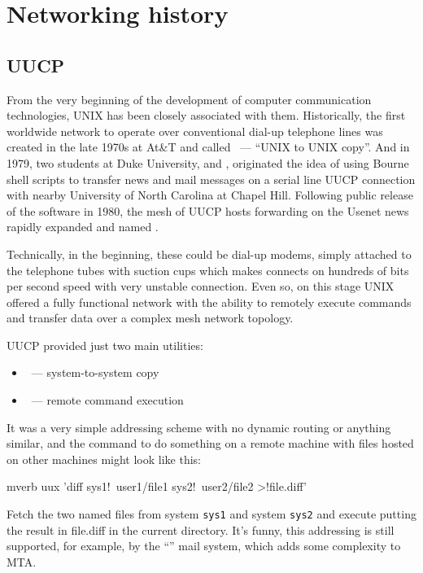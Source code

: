 \section*{Networking history} %

\subsection*{UUCP} %

From the very beginning of the development of computer communication
technologies, UNIX has been closely associated with them. Historically,
the first worldwide network to operate over conventional dial-up telephone
lines was created in the late 1970s at At\&T and called ~---
``UNIX to UNIX copy''. And in 1979, two students at Duke University,
 and , originated the idea of
using Bourne shell scripts to transfer news and mail messages on a serial line
UUCP connection with nearby University of North Carolina at Chapel Hill.
Following public release of the software in 1980, the mesh of UUCP hosts
forwarding on the Usenet news rapidly expanded and named .

Technically, in the beginning, these could be dial-up modems, simply attached
to the telephone tubes with suction cups which makes connects on hundreds of
bits per second speed with very unstable connection. Even so, on this stage
UNIX offered a fully functional network with the ability to remotely execute
commands and transfer data over a complex mesh network topology.

UUCP provided just two main utilities:
\begin{itemize}
\item {}~--- system-to-system copy
\item {}~--- remote command execution
\end{itemize}

It was a very simple addressing scheme with no dynamic routing or
anything similar, and the command to do something on a remote machine
with files hosted on other machines might look like this:
\begin{code}{mverb}
uux 'diff sys1!~user1/file1 sys2!~user2/file2 >!file.diff'
\end{code}

Fetch the two named files from system {\tt sys1} and system {\tt sys2} and
execute  putting the result in file.diff in the current directory.
It's funny, this addressing is still supported, for example,
by the ``'' mail system, which adds some complexity to MTA.


